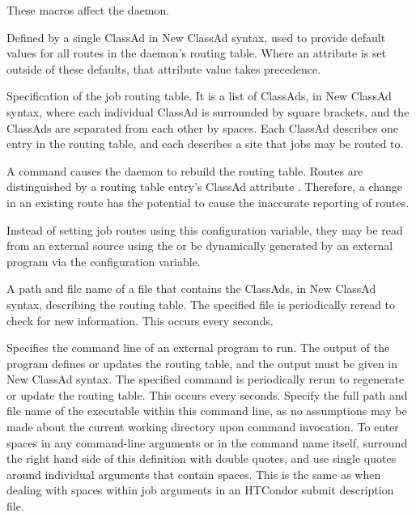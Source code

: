 These macros affect the  daemon.

\begin{description}

\label{param:JobRouterDefaults}
\item[\Macro{JOB\_ROUTER\_DEFAULTS}]
  Defined by a single ClassAd in New ClassAd syntax, 
  used to provide default values for all routes in the 
  daemon's routing table.
  Where an attribute is set outside of these defaults,
  that attribute value takes precedence.

\label{param:JobRouterEntries}
\item[\Macro{JOB\_ROUTER\_ENTRIES}]
  Specification of the job routing table.  It is a list of ClassAds,
  in New ClassAd syntax,
  where each individual ClassAd is surrounded by square brackets,
  and the ClassAds are separated from each other by spaces.
  Each ClassAd describes one entry in the routing table,
  and each describes a site that jobs may be routed to.

  A  command causes the  daemon
  to rebuild the routing table.
  Routes are distinguished by a routing table entry's ClassAd attribute
  .
  Therefore, a  change in an existing route has the potential to
  cause the inaccurate reporting of routes.

  Instead of setting job routes using this configuration variable,
  they may be read from an
  external source using the  or
  be dynamically generated by an external program via the
   configuration variable.


\label{param:JobRouterEntriesFile}
\item[\Macro{JOB\_ROUTER\_ENTRIES\_FILE}]
  A path and file name of a file that contains the ClassAds,
  in New ClassAd syntax, describing the routing table.
  The specified file is periodically reread to check for new information.
  This occurs every  seconds.

\label{param:JobRouterEntriesCmd}
\item[\Macro{JOB\_ROUTER\_ENTRIES\_CMD}]
  Specifies the command line of an external program
  to run.  The output of the program defines or updates the routing table,
  and the output must be given in New ClassAd syntax.
  The specified command is periodically rerun to regenerate or update
  the routing table.
  This occurs every  seconds.
  Specify the full path and file name of the executable within this
  command line, as no assumptions may be made about the current working
  directory upon command invocation.
  To enter spaces in any command-line arguments or in the command name itself,
  surround the right hand side of this definition with double quotes,
  and use single quotes around individual arguments that contain spaces.
  This is the same as when dealing with spaces within job arguments
  in an HTCondor submit description file. 


\end{description}
